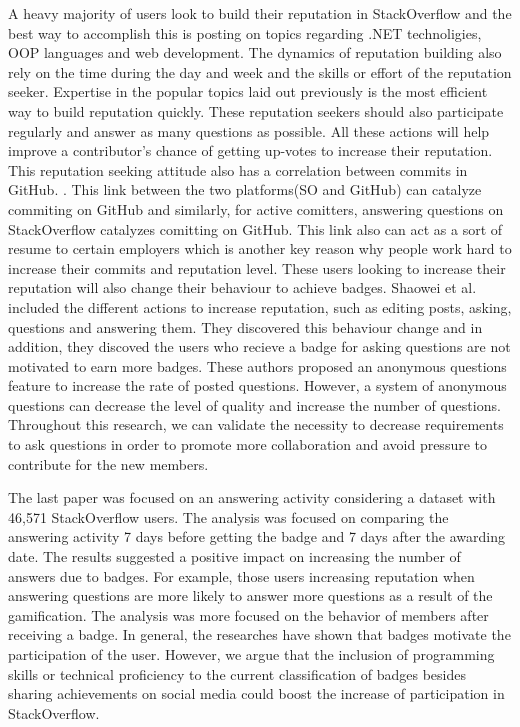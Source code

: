 \documentclass{sigchi}
\begin{document}
A heavy majority of users look to build their reputation in StackOverflow and the best way to accomplish this is posting on topics regarding .NET technoligies, OOP languages and web development. \cite{Bosu} The dynamics of reputation building also rely on the time during the day and week and the skills or effort of the reputation seeker. Expertise in the popular topics laid out previously is the most efficient way to build reputation quickly. These reputation seekers should also participate regularly and answer as many questions as possible. All these actions will help improve a contributor's chance of getting up-votes to increase their reputation.  This reputation seeking attitude also has a correlation between commits in GitHub. \cite{Vasilescu}. This link between the two platforms(SO and GitHub) can catalyze commiting on GitHub and similarly, for active comitters, answering questions on StackOverflow catalyzes comitting on GitHub. This link also can act as a sort of resume to certain employers which is another key reason why people work hard to increase their commits and reputation level. These users looking to increase their reputation will also change their behaviour to achieve badges. \cite{Wang}  Shaowei et al. included the different actions to increase reputation, such as editing posts, asking, questions and answering them. They discovered this behaviour change and in addition, they discoved the users who recieve a badge for asking questions are not motivated to earn more badges. These authors proposed an anonymous questions feature to increase the rate of posted questions. However, a system of anonymous questions can decrease the level of quality and increase the number of questions. Throughout this research, we can validate the necessity to decrease requirements to ask questions in order to promote more collaboration and avoid pressure to contribute for the new members.

The last paper was focused on an answering activity considering a dataset with 46,571 StackOverflow users. \cite{Cavusoglu} The analysis was focused on comparing the answering activity 7 days before getting the badge and 7 days after the awarding date. The results suggested a positive impact on increasing the number of answers due to badges. For example, those users increasing reputation when answering questions are more likely to answer more questions as a result of the gamification. The analysis was more focused on the behavior of members after receiving a badge. In general, the researches have shown that badges motivate the participation of the user. However, we argue that the inclusion of programming skills or technical proficiency to the current classification of badges besides sharing achievements on social media could boost the increase of participation in StackOverflow. 
\end{document}
